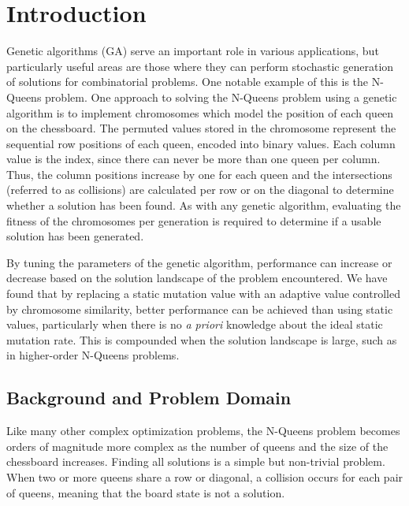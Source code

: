 \documentclass{sig-alternate}
\begin{document}




% 
%
\section{Introduction}
Genetic algorithms (GA) serve an important role in various applications, but particularly useful areas are those where they can perform stochastic generation of solutions for combinatorial problems. One notable example of this is the N-Queens problem. One approach to solving the N-Queens problem using a genetic algorithm is to implement chromosomes which model the position of each queen on the chessboard. The permuted values stored in the chromosome represent the sequential row positions of each queen, encoded into binary values. Each column value is the index, since there can never be more than one queen per column. Thus, the column positions increase by one for each queen and the intersections (referred to as collisions) are calculated per row or on the diagonal to determine whether a solution has been found. As with any genetic algorithm, evaluating the fitness of the chromosomes per generation is required to determine if a usable solution has been generated. 

By tuning the parameters of the genetic algorithm, performance can increase or decrease based on the solution landscape of the problem encountered. We have found that by replacing a static mutation value with an adaptive value controlled by chromosome similarity, better performance can be achieved than using static values, particularly when there is no \emph{a priori} knowledge about the ideal static mutation rate. This is compounded when the solution landscape is large, such as in higher-order N-Queens problems.

\subsection{Background and Problem Domain}
Like many other complex optimization problems, the N-Queens problem becomes orders of magnitude more complex as the number of queens and the size of the chessboard increases. Finding all solutions is a simple but non-trivial problem. When two or more queens share a row or diagonal, a collision occurs for each pair of queens, meaning that the board state is not a solution.
\end{document}
